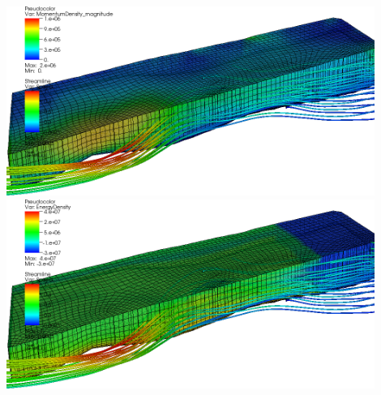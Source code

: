 \begin{frame}
  \includegraphics[width=0.9\textwidth]{figures/VHT/JakoSideMomentum} \\
  \includegraphics[width=0.9\textwidth]{figures/VHT/JakoSideEnergy}
\end{frame}
